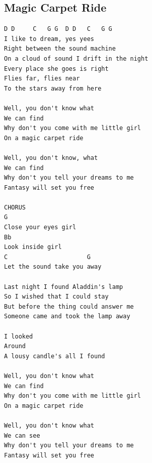 \documentclass[a4paper]{article}
\begin{document}
\subsection{Magic Carpet Ride} %
\label{sub:Magic Carpet Ride}
\begin{Verbatim}[commandchars=\\\{\}]
D D     C   G G  D D   C   G G
I like to dream, yes yees
Right between the sound machine
On a cloud of sound I drift in the night
Every place she goes is right
Flies far, flies near
To the stars away from here
 
Well, you don't know what
We can find
Why don't you come with me little girl
On a magic carpet ride
 
Well, you don't know, what
We can find
Why don't you tell your dreams to me
Fantasy will set you free
 
CHORUS
G
Close your eyes girl
Bb
Look inside girl
C                      G
Let the sound take you away
 
Last night I found Aladdin's lamp
So I wished that I could stay
But before the thing could answer me
Someone came and took the lamp away
 
I looked
Around
A lousy candle's all I found
 
Well, you don't know what
We can find
Why don't you come with me little girl
On a magic carpet ride
 
Well, you don't know what
We can see
Why don't you tell your dreams to me
Fantasy will set you free
\end{Verbatim}
\newpage
\end{document}
